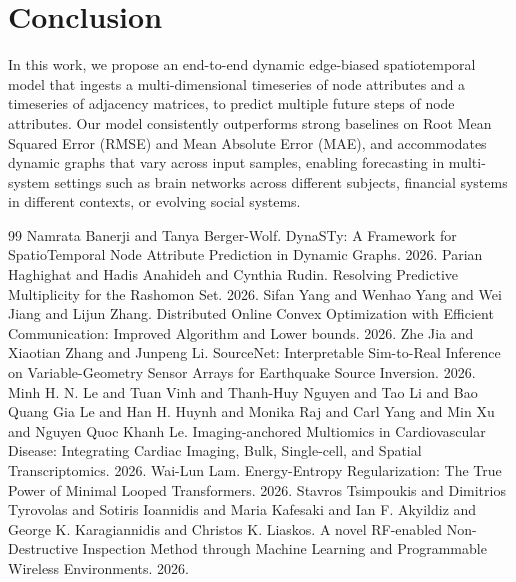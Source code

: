 \documentclass{article}
\begin{document}
\section{Conclusion}

In this work, we propose an end-to-end dynamic edge-biased spatiotemporal model that ingests a multi-dimensional timeseries of node attributes and a timeseries of adjacency matrices, to predict multiple future steps of node attributes. Our model consistently outperforms strong baselines on Root Mean Squared Error (RMSE) and Mean Absolute Error (MAE), and accommodates dynamic graphs that vary across input samples, enabling forecasting in multi-system settings such as brain networks across different subjects, financial systems in different contexts, or evolving social systems.

\begin{thebibliography}{99}
Namrata Banerji and Tanya Berger-Wolf. DynaSTy: A Framework for SpatioTemporal Node Attribute Prediction in Dynamic Graphs. 2026.
Parian Haghighat and Hadis Anahideh and Cynthia Rudin. Resolving Predictive Multiplicity for the Rashomon Set. 2026.
Sifan Yang and Wenhao Yang and Wei Jiang and Lijun Zhang. Distributed Online Convex Optimization with Efficient Communication: Improved Algorithm and Lower bounds. 2026.
Zhe Jia and Xiaotian Zhang and Junpeng Li. SourceNet: Interpretable Sim-to-Real Inference on Variable-Geometry Sensor Arrays for Earthquake Source Inversion. 2026.
Minh H. N. Le and Tuan Vinh and Thanh-Huy Nguyen and Tao Li and Bao Quang Gia Le and Han H. Huynh and Monika Raj and Carl Yang and Min Xu and Nguyen Quoc Khanh Le. Imaging-anchored Multiomics in Cardiovascular Disease: Integrating Cardiac Imaging, Bulk, Single-cell, and Spatial Transcriptomics. 2026.
Wai-Lun Lam. Energy-Entropy Regularization: The True Power of Minimal Looped Transformers. 2026.
Stavros Tsimpoukis and Dimitrios Tyrovolas and Sotiris Ioannidis and Maria Kafesaki and Ian F. Akyildiz and George K. Karagiannidis and Christos K. Liaskos. A novel RF-enabled Non-Destructive Inspection Method through Machine Learning and Programmable Wireless Environments. 2026.

\end{thebibliography}
\end{document}
